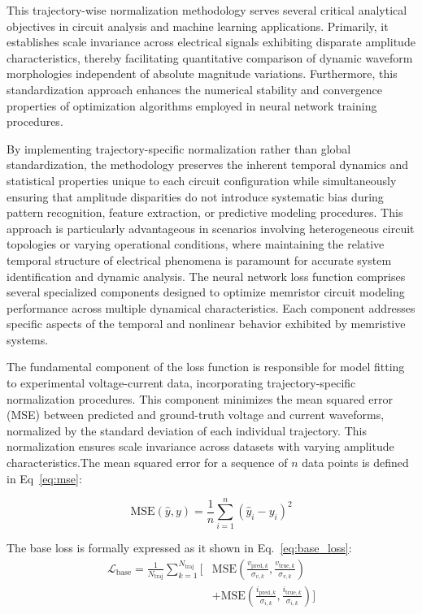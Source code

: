 \documentclass[lettersize,journal]{IEEEtran}
\begin{document}
This trajectory-wise normalization methodology serves several critical analytical objectives in circuit analysis and machine learning applications. Primarily, it establishes scale invariance across electrical signals exhibiting disparate amplitude characteristics, thereby facilitating quantitative comparison of dynamic waveform morphologies independent of absolute magnitude variations. Furthermore, this standardization approach enhances the numerical stability and convergence properties of optimization algorithms employed in neural network training procedures.


By implementing trajectory-specific normalization rather than global standardization, the methodology preserves the inherent temporal dynamics and statistical properties unique to each circuit configuration while simultaneously ensuring that amplitude disparities do not introduce systematic bias during pattern recognition, feature extraction, or predictive modeling procedures. This approach is particularly advantageous in scenarios involving heterogeneous circuit topologies or varying operational conditions, where maintaining the relative temporal structure of electrical phenomena is paramount for accurate system identification and dynamic analysis.
The neural network loss function comprises several specialized components designed to optimize memristor circuit modeling performance across multiple dynamical characteristics. Each component addresses specific aspects of the temporal and nonlinear behavior exhibited by memristive systems.

The fundamental component of the loss function is responsible for model fitting to experimental voltage-current data, incorporating trajectory-specific normalization procedures. This component minimizes the mean squared error (MSE) between predicted and ground-truth voltage and current waveforms, normalized by the standard deviation of each individual trajectory. This normalization ensures scale invariance across datasets with varying amplitude characteristics.The mean squared error for a sequence of \(n\) data points is defined in Eq~\eqref{eq:mse}:

\begin{equation}
  \mathrm{MSE}(\hat{y}, y) = \frac{1}{n} \sum_{i=1}^{n} (\hat{y}_i - y_i)^2
  \label{eq:mse}
\end{equation}

The base loss is formally expressed as it shown in Eq.~\eqref{eq:base_loss}:
\begin{equation}
  \begin{split}
    \mathcal{L}_{\mathrm{base}} = \frac{1}{N_{\text{traj}}} \sum_{k=1}^{N_{\text{traj}}} \Bigg[ & \mathrm{MSE}\left(\frac{v_{\mathrm{pred},k}}{\sigma_{v,k}}, \frac{v_{\mathrm{true},k}}{\sigma_{v,k}}\right)          \\
                                                                                                & + \mathrm{MSE}\left(\frac{i_{\mathrm{pred},k}}{\sigma_{i,k}}, \frac{i_{\mathrm{true},k}}{\sigma_{i,k}}\right) \Bigg]
  \end{split}
  \label{eq:base_loss}
\end{equation}
\end{document}
